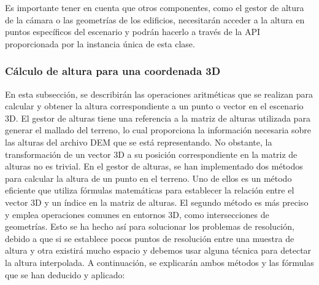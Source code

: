 \documentclass[a4paper, 11pt]{book}
\begin{document}
Es importante tener en cuenta que otros componentes, como el gestor de altura de la cámara o las geometrías de los edificios, necesitarán acceder a la altura en puntos específicos del escenario y podrán hacerlo a través de la \textsc{API} proporcionada por la instancia única de esta clase.
\subsubsection{Cálculo de altura para una coordenada 3D}
\label{subsubsec:calculoAltura3D}
En esta subsección, se describirán las operaciones aritméticas que se realizan para calcular y obtener la altura correspondiente a un punto o vector en el escenario 3D. El gestor de alturas tiene una referencia a la matriz de alturas utilizada para generar el mallado del terreno, lo cual proporciona la información necesaria sobre las alturas del archivo \textsc{DEM} que se está representando. No obstante, la transformación de un vector 3D a su posición correspondiente en la matriz de alturas no es trivial.
En el gestor de alturas, se han implementado dos métodos para calcular la altura de un punto en el terreno. Uno de ellos es un método eficiente que utiliza fórmulas matemáticas para establecer la relación entre el vector \textsc{3D} y un índice en la matriz de alturas. El segundo método es más preciso y emplea operaciones comunes en entornos \textsc{3D}, como intersecciones de geometrías. Esto se ha hecho así para solucionar los problemas de resolución, debido a que si se establece pocos puntos de resolución entre una muestra de altura y otra existirá mucho espacio y debemos usar alguna técnica para detectar la altura interpolada.
A continuación, se explicarán ambos métodos y las fórmulas que se han deducido y aplicado:
\end{document}
